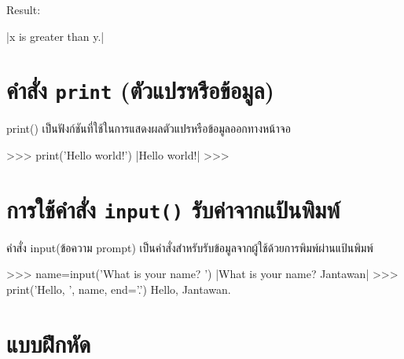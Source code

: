 Result:

\begin{pycode}
|x is greater than y.|
\end{pycode}


\section{คำสั่ง \texttt{print} (ตัวแปรหรือข้อมูล)}

print() เป็นฟังก์ชันที่ใช้ในการแสดงผลตัวแปรหรือข้อมูลออกทางหน้าจอ 

\begin{pycode}
>>> print('Hello world!')
|Hello world!|
>>>
\end{pycode}


\section{การใช้คำสั่ง \texttt{input()} รับค่าจากแป้นพิมพ์}

คำสั่ง input(ข้อความ prompt) เป็นคำสั่งสำหรับรับข้อมูลจากผู้ใช้ด้วยการพิมพ์ผ่านแป้นพิมพ์ 

\begin{pycode}
>>> name=input('What is your name? ')
|What is your name? Jantawan|
>>> print('Hello, ', name, end='.')
Hello, Jantawan.
\end{pycode}


\section{แบบฝึกหัด}

